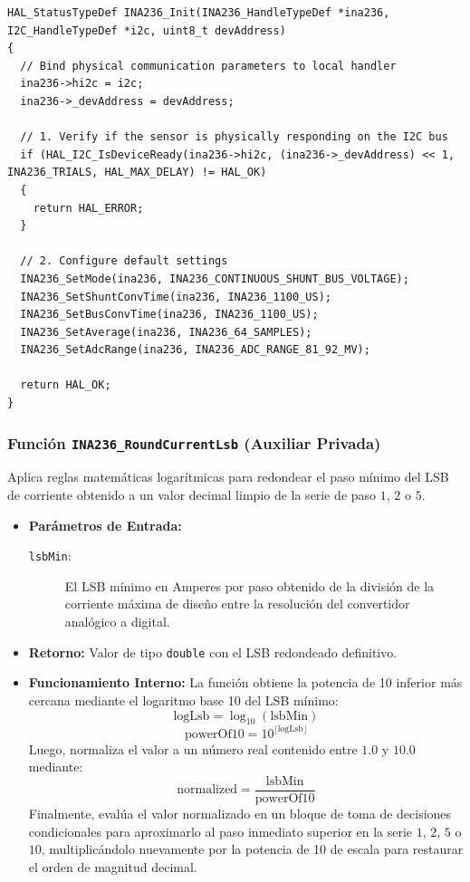 \documentclass[
10pt, %
a4paper, %
oneside, %
headinclude,footinclude, %
BCOR5mm, %
]{scrartcl}
\begin{document}
\begin{lstlisting}[style=CMakeStyle]
HAL_StatusTypeDef INA236_Init(INA236_HandleTypeDef *ina236, I2C_HandleTypeDef *i2c, uint8_t devAddress)
{
  // Bind physical communication parameters to local handler
  ina236->hi2c = i2c;
  ina236->_devAddress = devAddress;

  // 1. Verify if the sensor is physically responding on the I2C bus
  if (HAL_I2C_IsDeviceReady(ina236->hi2c, (ina236->_devAddress) << 1, INA236_TRIALS, HAL_MAX_DELAY) != HAL_OK)
  {
    return HAL_ERROR;
  }

  // 2. Configure default settings
  INA236_SetMode(ina236, INA236_CONTINUOUS_SHUNT_BUS_VOLTAGE);
  INA236_SetShuntConvTime(ina236, INA236_1100_US);
  INA236_SetBusConvTime(ina236, INA236_1100_US);
  INA236_SetAverage(ina236, INA236_64_SAMPLES);
  INA236_SetAdcRange(ina236, INA236_ADC_RANGE_81_92_MV);

  return HAL_OK;
}
\end{lstlisting}

\subsubsection{Función \texttt{INA236\_RoundCurrentLsb} (Auxiliar Privada)}
Aplica reglas matemáticas logarítmicas para redondear el paso mínimo del LSB de corriente obtenido a un valor decimal limpio de la serie de paso $1$, $2$ o $5$.

\begin{itemize}
	\item \textbf{Parámetros de Entrada:}
		\begin{description}
			\item[\texttt{lsbMin}:] El LSB mínimo en Amperes por paso obtenido de la división de la corriente máxima de diseño entre la resolución del convertidor analógico a digital.
		\end{description}
	\item \textbf{Retorno:} Valor de tipo \texttt{double} con el LSB redondeado definitivo.
	\item \textbf{Funcionamiento Interno:}
		La función obtiene la potencia de 10 inferior más cercana mediante el logaritmo base 10 del LSB mínimo:
		\begin{equation}
			\text{logLsb} = \log_{10}(\text{lsbMin})
		\end{equation}
		\begin{equation}
			\text{powerOf10} = 10^{\lfloor\text{logLsb}\rfloor}
		\end{equation}
		Luego, normaliza el valor a un número real contenido entre $1.0$ y $10.0$ mediante:
		\begin{equation}
			\text{normalized} = \frac{\text{lsbMin}}{\text{powerOf10}}
		\end{equation}
		Finalmente, evalúa el valor normalizado en un bloque de toma de decisiones condicionales para aproximarlo al paso inmediato superior en la serie $1$, $2$, $5$ o $10$, multiplicándolo nuevamente por la potencia de 10 de escala para restaurar el orden de magnitud decimal.
\end{itemize}
\end{document}
